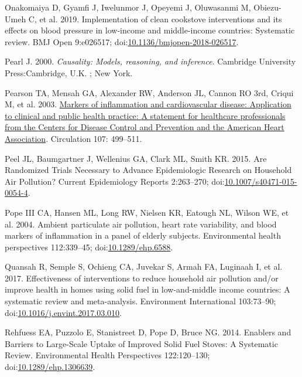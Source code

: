 \documentclass[
  letterpaper,
  DIV=11,
  numbers=noendperiod]{scrartcl}
\newlength{\cslhangindent}
\newenvironment{CSLReferences}[2] %
 {\begin{list}{}{%
  \setlength{\itemindent}{0pt}
  \setlength{\leftmargin}{0pt}
  \setlength{\parsep}{0pt}
  \ifodd #1
   \setlength{\leftmargin}{\cslhangindent}
   \setlength{\itemindent}{-1\cslhangindent}
  \fi
  \setlength{\itemsep}{#2\baselineskip}}}
 {\end{list}}
\begin{document}
\begin{CSLReferences}{1}{1}
Onakomaiya D, Gyamfi J, Iwelunmor J, Opeyemi J, Oluwasanmi M,
Obiezu-Umeh C, et al. 2019. Implementation of clean cookstove
interventions and its effects on blood pressure in low-income and
middle-income countries: Systematic review. BMJ Open 9:e026517;
doi:\href{https://doi.org/10.1136/bmjopen-2018-026517}{10.1136/bmjopen-2018-026517}.

Pearl J. 2000. \emph{Causality: Models, reasoning, and inference}.
Cambridge University Press:Cambridge, U.K. ; New York.

Pearson TA, Mensah GA, Alexander RW, Anderson JL, Cannon RO 3rd, Criqui
M, et al. 2003.
\href{https://www.ncbi.nlm.nih.gov/pubmed/12551878}{Markers of
inflammation and cardiovascular disease: Application to clinical and
public health practice: {A} statement for healthcare professionals from
the {Centers} for {Disease Control} and {Prevention} and the {American
Heart Association}}. Circulation 107: 499--511.

Peel JL, Baumgartner J, Wellenius GA, Clark ML, Smith KR. 2015. Are
{Randomized Trials Necessary} to {Advance Epidemiologic Research} on
{Household Air Pollution}? Current Epidemiology Reports 2:263--270;
doi:\href{https://doi.org/10.1007/s40471-015-0054-4}{10.1007/s40471-015-0054-4}.

Pope III CA, Hansen ML, Long RW, Nielsen KR, Eatough NL, Wilson WE, et
al. 2004. Ambient particulate air pollution, heart rate variability, and
blood markers of inflammation in a panel of elderly subjects.
Environmental health perspectives 112:339--45;
doi:\href{https://doi.org/10.1289/ehp.6588}{10.1289/ehp.6588}.

Quansah R, Semple S, Ochieng CA, Juvekar S, Armah FA, Luginaah I, et al.
2017. Effectiveness of interventions to reduce household air pollution
and/or improve health in homes using solid fuel in low-and-middle income
countries: {A} systematic review and meta-analysis. Environment
International 103:73--90;
doi:\href{https://doi.org/10.1016/j.envint.2017.03.010}{10.1016/j.envint.2017.03.010}.

Rehfuess EA, Puzzolo E, Stanistreet D, Pope D, Bruce NG. 2014. Enablers
and {Barriers} to {Large-Scale Uptake} of {Improved Solid Fuel Stoves}:
{A Systematic Review}. Environmental Health Perspectives 122:120--130;
doi:\href{https://doi.org/10.1289/ehp.1306639}{10.1289/ehp.1306639}.


\end{CSLReferences}
\end{document}
